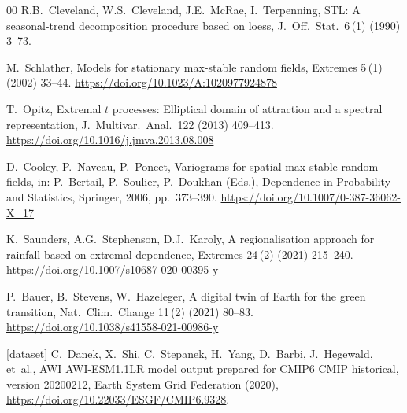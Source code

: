 \documentclass[preprint,12pt,a4paper]{elsarticle}
\newcommand{\rev}[1]{{#1}}
\begin{document}
\begin{thebibliography}{00}
\rev{R.B.~Cleveland, W.S.~Cleveland, J.E.~McRae, I.~Terpenning,
STL: A seasonal-trend decomposition procedure based on loess,
J.\ Off.\ Stat.\ 6\,(1) (1990) 3--73.}

M.~Schlather,
Models for stationary max-stable random fields,
Extremes 5\,(1) (2002) 33--44.
\url{https://doi.org/10.1023/A:1020977924878}

T.~Opitz,
Extremal $t$ processes: Elliptical domain of attraction and a
spectral representation,
J.\ Multivar.\ Anal.\ 122 (2013) 409--413.
\url{https://doi.org/10.1016/j.jmva.2013.08.008}

D.~Cooley, P.~Naveau, P.~Poncet,
Variograms for spatial max-stable random fields,
in: P.~Bertail, P.~Soulier, P.~Doukhan (Eds.),
Dependence in Probability and Statistics,
Springer, 2006, pp.~373--390.
\url{https://doi.org/10.1007/0-387-36062-X_17}

K.~Saunders, A.G.~Stephenson, D.J.~Karoly,
A regionalisation approach for rainfall based on extremal dependence,
Extremes 24\,(2) (2021) 215--240.
\url{https://doi.org/10.1007/s10687-020-00395-y}

P.~Bauer, B.~Stevens, W.~Hazeleger,
A digital twin of Earth for the green transition,
Nat.\ Clim.\ Change 11\,(2) (2021) 80--83.
\url{https://doi.org/10.1038/s41558-021-00986-y}

[dataset] C.~Danek, X.~Shi, C.~Stepanek, H.~Yang, D.~Barbi,
J.~Hegewald, et~al.,
AWI AWI-ESM1.1LR model output prepared for CMIP6 CMIP historical,
version 20200212, Earth System Grid Federation (2020),
\url{https://doi.org/10.22033/ESGF/CMIP6.9328}.

\end{thebibliography}
\end{document}
